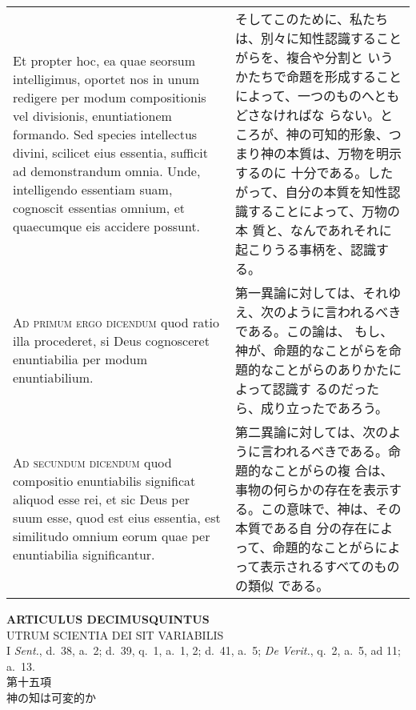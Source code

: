 \documentclass[10pt]{jsarticle} %
\begin{document}
\begin{longtable}{p{21em}p{21em}}
Et propter hoc, ea quae seorsum intelligimus, oportet nos in unum
redigere per modum compositionis vel divisionis, enuntiationem
formando. Sed species intellectus divini, scilicet eius essentia,
sufficit ad demonstrandum omnia. Unde, intelligendo essentiam suam,
cognoscit essentias omnium, et quaecumque eis accidere possunt.


&

そしてこのために、私たちは、別々に知性認識することがらを、複合や分割と
いうかたちで命題を形成することによって、一つのものへともどさなければな
らない。ところが、神の可知的形象、つまり神の本質は、万物を明示するのに
十分である。したがって、自分の本質を知性認識することによって、万物の本
質と、なんであれそれに起こりうる事柄を、認識する。

\\


{\scshape Ad primum ergo dicendum} quod ratio illa procederet, si Deus
cognosceret enuntiabilia per modum enuntiabilium.


&

第一異論に対しては、それゆえ、次のように言われるべきである。この論は、
もし、神が、命題的なことがらを命題的なことがらのありかたによって認識す
るのだったら、成り立ったであろう。

\\


{\scshape Ad secundum dicendum} quod compositio enuntiabilis
significat aliquod esse rei, et sic Deus per suum esse, quod est eius
essentia, est similitudo omnium eorum quae per enuntiabilia
significantur.

&


第二異論に対しては、次のように言われるべきである。命題的なことがらの複
合は、事物の何らかの存在を表示する。この意味で、神は、その本質である自
分の存在によって、命題的なことがらによって表示されるすべてのものの類似
である。

\end{longtable}
\newpage



\begin{center}
{\Large {\bf ARTICULUS DECIMUSQUINTUS}}\\ {\large UTRUM SCIENTIA DEI
SIT VARIABILIS}\\ {\footnotesize I {\itshape Sent.}, d.~38, a.~2;
d.~39, q.~1, a.~1, 2; d.~41, a.~5; {\itshape De Verit.}, q.~2, a.~5,
ad 11; a.~13.}\\ {\Large 第十五項\\神の知は可変的か}
\end{center}
\end{document}

